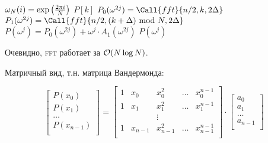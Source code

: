\noindent
\begin{minipage}{\textwidth}
    \begin{algorithmic}
        \State $\omega_N(i) = \exp \left( \frac{2 \pi i}{N} \right)$
                \Return $P[k]$
            \EndIf
            \State $P_0(\omega^{2j}) = \Call{fft}{n / 2, k, 2 \Delta}$
            \State $P_1(\omega^{2j}) = \Call{fft}{n / 2, (k + \Delta) \Mod N, 2 \Delta}$
                \State $P(\omega^j) = P_0(\omega^{2j}) + \omega^j \cdot A_1(\omega^{2j})$
            \EndFor
            \Return $P(\omega^j)$
        \EndFunction
    \end{algorithmic}
\end{minipage}

Очевидно, \textsc{fft} работает за $\mathcal{O}(N \log N)$.

Матричный вид, т.н. матрица Вандермонда:

\[
    \begin{bmatrix}
        P(x_0) \\
        P(x_1) \\
        \ldots \\
        P(x_{n - 1}) \\
    \end{bmatrix}
    =
    \begin{bmatrix}
        1 & x_0 & x_0^2 & \ldots & x_0^{n - 1} \\
        1 & x_1 & x_1^2 & \ldots & x_1^{n - 1} \\
        & & \vdots & & \\
        1 & x_{n - 1} & x_{n - 1}^2 & \ldots & x_{n - 1}^{n - 1} \\
    \end{bmatrix}
    \cdot
    \begin{bmatrix}
        a_0 \\
        a_1 \\
        \ldots \\
        a_{n - 1} \\
    \end{bmatrix}
\]

